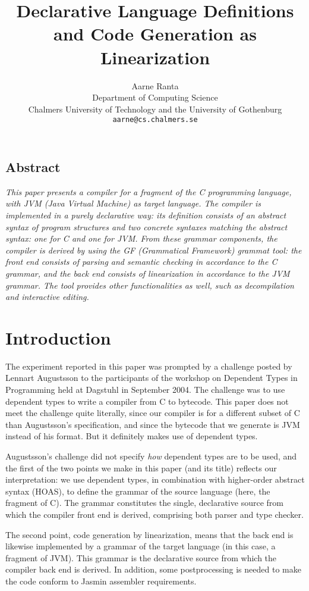 \documentclass[12pt]{article}
\title{{\bf Declarative Language Definitions and Code Generation as Linearization}}
\author{Aarne Ranta \\
  Department of Computing Science \\
  Chalmers University of Technology and the University of Gothenburg\\
  {\tt aarne@cs.chalmers.se}}
\begin{document}
\maketitle


\subsection*{Abstract}

{\em
This paper presents a compiler for a fragment of the C programming
language, with JVM (Java Virtual Machine) as target language.
The compiler is implemented in a purely declarative way:
its definition consists of an abstract syntax of program
structures and two concrete syntaxes matching the abstract
syntax: one for C and one for JVM. From these grammar components,
the compiler is derived by using the GF (Grammatical Framework)
grammat tool: the front end consists of parsing and semantic
checking in accordance to the C grammar, and the back end consists
of linearization in accordance to the JVM grammar. The tool provides
other functionalities as well, such as decompilation and interactive
editing. 
}

\section{Introduction}

The experiment reported in this paper was prompted by a challenge
posted by Lennart Augustsson to the participants of the workshop
on Dependent Types in Programming held at Dagstuhl in September 2004.
The challenge was to use dependent types to write a compiler from
C to bytecode. This paper does not meet the challenge quite literally,
since our compiler is for a different subset of C than Augustsson's
specification, and since the bytecode that we generate is JVM instead
of his format. But it definitely makes use of dependent types.

Augustsson's  challenge did not specify \textit{how} dependent
types are to be used, and the first of the two points we make in this
paper (and its title) reflects our interpretation:
we use dependent types, in combination with higher-order abstract syntax (HOAS),
to define the grammar of the source language (here, the fragment of C).
The grammar constitutes the single, declarative source from which
the compiler front end is derived, comprising both parser and type
checker.

The second point, code generation by linearization, means that the
back end is likewise implemented by a grammar of the target
language (in this case, a fragment of JVM). This grammar is the
declarative source from which the compiler back end is derived.
In addition, some postprocessing is needed to
make the code conform to Jasmin assembler requirements.
\end{document}
